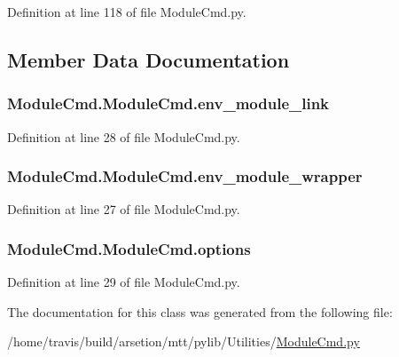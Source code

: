 Definition at line 118 of file Module\-Cmd.\-py.



\subsection{Member Data Documentation}
\hypertarget{classModuleCmd_1_1ModuleCmd_a1b4a34e278600fe59cd55bb0d56baa61}{
\subsubsection[{env\-\_\-module\-\_\-link}]{\setlength{\rightskip}{0pt plus 5cm}Module\-Cmd.\-Module\-Cmd.\-env\-\_\-module\-\_\-link}}\label{classModuleCmd_1_1ModuleCmd_a1b4a34e278600fe59cd55bb0d56baa61}


Definition at line 28 of file Module\-Cmd.\-py.

\hypertarget{classModuleCmd_1_1ModuleCmd_ae60edec82191b5a7a1830495b1ca2e3e}{
\subsubsection[{env\-\_\-module\-\_\-wrapper}]{\setlength{\rightskip}{0pt plus 5cm}Module\-Cmd.\-Module\-Cmd.\-env\-\_\-module\-\_\-wrapper}}\label{classModuleCmd_1_1ModuleCmd_ae60edec82191b5a7a1830495b1ca2e3e}


Definition at line 27 of file Module\-Cmd.\-py.

\hypertarget{classModuleCmd_1_1ModuleCmd_a981a0fc879a722b76faa16b4289ab953}{
\subsubsection[{options}]{\setlength{\rightskip}{0pt plus 5cm}Module\-Cmd.\-Module\-Cmd.\-options}}\label{classModuleCmd_1_1ModuleCmd_a981a0fc879a722b76faa16b4289ab953}


Definition at line 29 of file Module\-Cmd.\-py.



The documentation for this class was generated from the following file\-:\begin{DoxyCompactItemize}
\item 
/home/travis/build/arsetion/mtt/pylib/\-Utilities/\hyperlink{ModuleCmd_8py}{Module\-Cmd.\-py}\end{DoxyCompactItemize}
